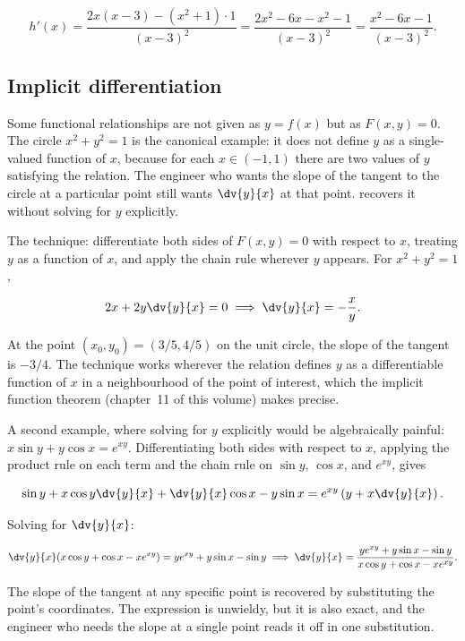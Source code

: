 \[
h'(x) = \frac{2 x (x - 3) - (x^{2} + 1) \cdot 1}{(x - 3)^{2}} =
\frac{2 x^{2} - 6 x - x^{2} - 1}{(x - 3)^{2}} = \frac{x^{2} -
6 x - 1}{(x - 3)^{2}}.
\]

\subsection{Implicit differentiation}

Some functional relationships are not given as $y = f(x)$ but as
$F(x, y) = 0$. The circle $x^{2} + y^{2} = 1$ is the canonical
example: it does not define $y$ as a single-valued function of
$x$, because for each $x \in (-1, 1)$ there are two values of $y$
satisfying the relation. The engineer who wants the slope of the
tangent to the circle at a particular point still wants
$\dv{y}{x}$ at that point. 
recovers it without solving for $y$ explicitly.

The technique: differentiate both sides of $F(x, y) = 0$ with
respect to $x$, treating $y$ as a function of $x$, and apply the
chain rule wherever $y$ appears. For $x^{2} + y^{2} = 1$,

\[
2 x + 2 y \dv{y}{x} = 0 \implies \dv{y}{x} = -\frac{x}{y}.
\]

At the point $(x_{0}, y_{0}) = (3/5, 4/5)$ on the unit circle, the
slope of the tangent is $-3/4$. The technique works wherever the
relation defines $y$ as a differentiable function of $x$ in a
neighbourhood of the point of interest, which the implicit
function theorem (chapter~11 of this volume) makes precise.

A second example, where solving for $y$ explicitly would be
algebraically painful: $x \sin y + y \cos x = e^{x y}$.
Differentiating both sides with respect to $x$, applying the
product rule on each term and the chain rule on $\sin y$, $\cos
x$, and $e^{x y}$, gives

\[
\sin y + x \cos y \dv{y}{x} + \dv{y}{x} \cos x - y \sin x =
e^{x y} \left(y + x \dv{y}{x}\right).
\]

Solving for $\dv{y}{x}$:

\[
\dv{y}{x} (x \cos y + \cos x - x e^{x y}) = y e^{x y} + y \sin x
- \sin y \implies \dv{y}{x} = \frac{y e^{x y} + y \sin x - \sin y}
{x \cos y + \cos x - x e^{x y}}.
\]

The slope of the tangent at any specific point is recovered by
substituting the point's coordinates. The expression is unwieldy,
but it is also exact, and the engineer who needs the slope at a
single point reads it off in one substitution.

